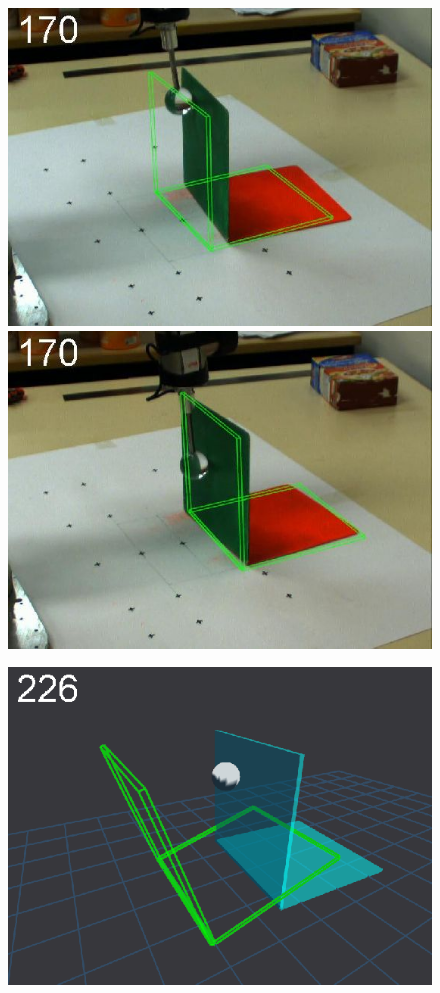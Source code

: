 \begin{figure}[tb]
{\includegraphics[width=\imgBXwid]{images/B2_LWPR1_58_2}
\includegraphics[width=\imgBXwid]{images/B2_2exp_38_2}
}
\centerline{
\includegraphics[width=\imgBXwid]{images/B1_1exp_20_3}
}
\end{figure}
